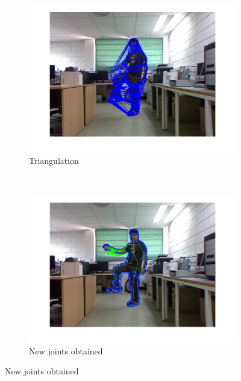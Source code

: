 \begin{figure}[t]
        \centering
        \begin{subfigure}[b]{0.45\textwidth}
                \centering
                \includegraphics[width=\textwidth, trim=0 0 0 0,clip]{fig21.jpg}
                \caption{Triangulation}
                \label{fig:cp02_err_measure_triangulation}
        \end{subfigure}%
        ~
        \begin{subfigure}[b]{0.45\textwidth}
                \centering
                \includegraphics[width=\textwidth, trim=0 0 0 0,clip]{fig23.jpg}
                \caption{New joints obtained}
                \label{fig:cp02_err_measure_new_joints}
        \end{subfigure}%
        

\end{figure}
